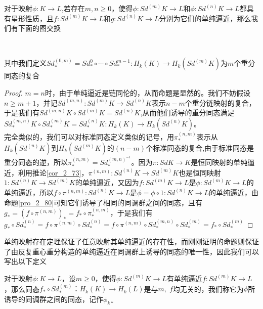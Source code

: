 \begin{proposition}
对于映射$\phi:K\rightarrow L$,若存在$m,n\geq 0$，使得$\phi:Sd^{(m)}K\rightarrow L$和$\phi:Sd^{(n)}K\rightarrow L$都具有星形性质，且$f:Sd^{(m)}K\rightarrow L$和$g:Sd^{(n)}K\rightarrow L$分别为它们的单纯逼近，那么我们有下面的图交换
{\center
{}\\}
其中我们定义$Sd_{*}^{(0,m)}=Sd_{*}^{0}\circ\cdots\circ Sd_{*}^{m-1}:H_{k}(K)\rightarrow H_{k}(Sd^{(m)}K)$为$m$个重分同态的复合
\end{proposition}
\begin{proof}
$m=n$时，由于单纯逼近是链同伦的，从而命题是显然的。我们不妨假设$n\geq m+1$，并记$Sd^{(m,n)}:Sd^{(m)}K\rightarrow Sd^{(n)}K$表示$n-m$个重分链映射的复合，于是我们有$Sd^{(m,n)}K\circ Sd^{(m)}K=Sd^{(n)}K$,从而他们诱导的重分同态满足$Sd_{*}^{(m,n)}K\circ Sd_{*}^{(m)}K=Sd_{*}^{(n)}K:H_{k}(K)\rightarrow H_{k}(Sd^{(n)}K)$。\\
完全类似的，我们可以对标准同态定义类似的记号，用$\pi^{(n,m)}_{*}$表示从$H_{k}(Sd^{(n)}K)$到$H_{k}(Sd^{(m)}K)$的$(n-m)$个标准同态的复合,由于标准同态是重分同态的逆，所以$\pi^{(n,m)}_{*}=Sd_{*}^{(m,n)^{-1}}$。因为$\pi:SdK\rightarrow K$是恒同映射的单纯逼近，利用推论\eqref{cor_2_73}，$\pi^{(n,m)}:Sd^{(n)}K\rightarrow Sd^{(m)}K$也是恒同映射$1:Sd^{(n)}K\rightarrow Sd^{(m)}K$的单纯逼近，又因为$f:Sd^{(m)}K\rightarrow L$是$\phi:Sd^{(m)}K\rightarrow L$的单纯逼近，所以$f\circ \pi^{(n,m)}:Sd^{(n)}K\rightarrow L$是$\phi=\phi\circ 1:Sd^{(n)}K\rightarrow L$的单纯逼近，由命题\eqref{pro_2_80}可知它们诱导了相同的同调群之间的同态，且有$g_{*}=(f\circ \pi^{(n,m)})_{*}=f_{*}\circ \pi^{(n,m)}_{*}$，于是我们有
$g_{*}\circ Sd^{(n)}_{*}=f\circ \pi^{(n,m)}\circ Sd^{(n)}_{*}=f\circ \pi^{(n,m)}\circ Sd^{(m,n)}_{*}\circ Sd^{(m)}_{*}=f_{*}\circ Sd^{(m)}_{*}$
\end{proof}
单纯映射存在定理保证了任意映射其单纯逼近的存在性，而刚刚证明的命题则保证了由反复重心重分构造的单纯逼近在同调群上诱导的同态的唯一性，因此我们可以写出以下定义
\begin{definition}\label{def_129}
对于映射$\phi:K\rightarrow L$，设$m\geq 0$，使得$\phi:Sd^{(m)}K\rightarrow L$有单纯逼近$f:Sd^{(m)}K\rightarrow L$，那么同态$f_{*}\circ Sd_{*}^{(m)}：H_{k}(K)\rightarrow H_{k}(L)$是与$m,\;f$均无关的，我们称它为$\phi$所诱导的同调群之间的同态，记作$\phi_{k*}$
\end{definition}
